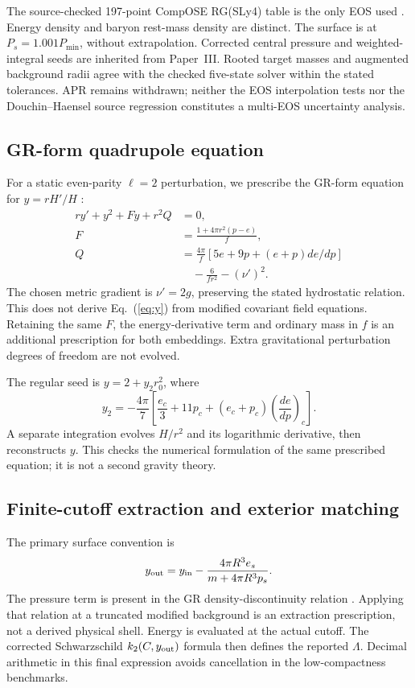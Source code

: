 \documentclass[twocolumn,prd,superscriptaddress,nofootinbib]{revtex4-2}
\begin{document}
The source-checked 197-point CompOSE RG(SLy4) table is the only EOS used
\cite{CompOSE,WorkingEvidence}. Energy density and baryon rest-mass density
are distinct. The surface is at $P_s=1.001P_{\min}$, without extrapolation.
Corrected central pressure and weighted-integral seeds are inherited from
Paper~III. Rooted target masses and augmented background radii agree with
the checked five-state solver within the stated tolerances. APR remains
withdrawn; neither the EOS interpolation tests nor the Douchin--Haensel
source regression constitutes a multi-EOS uncertainty analysis.

\subsection{GR-form quadrupole equation}
For a static even-parity $\ell=2$ perturbation, we prescribe the GR-form
equation for $y=rH'/H$ \cite{Hinderer2008,Postnikov2010}:
\begin{align}
 ry'+y^2+Fy+r^2Q&=0,\label{eq:y}\\
 F&=\frac{1+4\pi r^2(p-e)}{f},\\
 Q&=\frac{4\pi}{f}[5e+9p+(e+p)de/dp]
 \nonumber\\ &\quad-\frac{6}{fr^2}-(\nu')^2.
 \label{eq:Q}
\end{align}
The chosen metric gradient is $\nu'=2g$, preserving the stated hydrostatic
relation. This does not derive Eq.~(\ref{eq:y}) from modified covariant
field equations. Retaining the same $F$, the energy-derivative term and
ordinary mass in $f$ is an additional prescription for both embeddings.
Extra gravitational perturbation degrees of freedom are not evolved.

The regular seed is $y=2+y_2r_0^2$, where
\begin{equation}
 y_2=-\frac{4\pi}{7}\left[\frac{e_c}{3}+11p_c+
 (e_c+p_c)\left(\frac{de}{dp}\right)_c\right].
\end{equation}
A separate integration evolves $H/r^2$ and its logarithmic derivative,
then reconstructs $y$. This checks the numerical formulation of the same
prescribed equation; it is not a second gravity theory.

\subsection{Finite-cutoff extraction and exterior matching}
The primary surface convention is
\begin{equation}
 y_{\rm out}=y_{\rm in}-\frac{4\pi R^3e_s}{m+4\pi R^3p_s}.
 \label{eq:jump}
\end{equation}
The pressure term is present in the GR density-discontinuity relation
\cite{Takatsy2020}. Applying that relation at a truncated modified
background is an extraction prescription, not a derived physical shell.
Energy is evaluated at the actual cutoff. The corrected Schwarzschild
$k_2(C,y_{\rm out})$ formula \cite{Hinderer2008} then defines the reported
$\Lambda$. Decimal arithmetic in this final expression avoids cancellation
in the low-compactness benchmarks.
\end{document}
